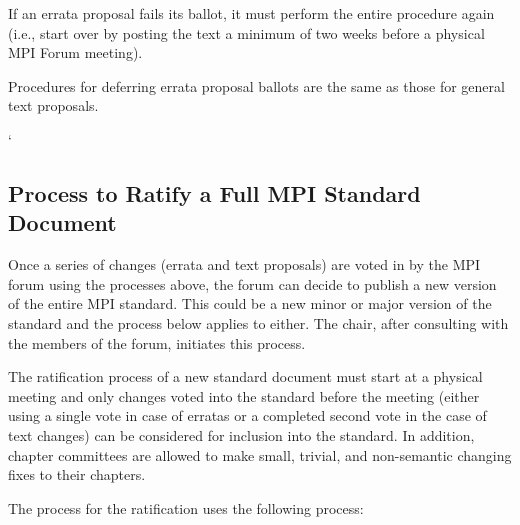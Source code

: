 If an errata proposal fails its ballot, it must perform the entire
procedure again (i.e., start over by posting the text a minimum of two
weeks before a physical MPI Forum meeting).

Procedures for deferring errata proposal ballots are the same as
those for general text proposals.


`
\subsection{Process to Ratify a Full MPI Standard Document}

Once a series of changes (errata and text proposals) are voted in by the MPI forum using the processes above, the forum can decide to publish a new version of the entire MPI standard. This could be a new minor or major version of the standard and the process below applies to either. The chair, after consulting with the members of the forum, initiates this process.

The ratification process of a new standard document must start at a physical meeting and only changes voted into the standard before the meeting (either using a single vote in case of erratas or a completed second vote in the case of text changes) can be considered for inclusion into the standard. In addition, chapter committees are allowed to make small, trivial, and non-semantic changing fixes to their chapters.

The process for the ratification uses the following process:

